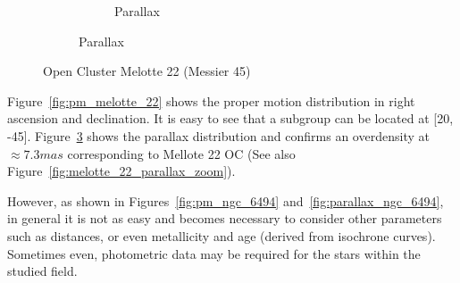\documentclass[11pt, a4paper, english]{book}
\begin{document}
\begin{figure}[htbp]
\begin{subfigure}{0.9\textwidth}
\begin{subfigure}[t]{0.45\textwidth}
      \caption{Parallax}
      \label{fig:pm_vec_melotte_22}
    \end{subfigure}
  \end{subfigure}
  \caption{Open Cluster Melotte 22 (Messier 45)}
\end{figure}

Figure~\ref{fig:pm_melotte_22} shows the proper motion distribution in right ascension and declination.
It is easy to see that a subgroup can be located at [20, -45].
Figure~\ref{fig:pm_vec_melotte_22} shows the parallax distribution and confirms an overdensity at
\(\approx 7.3 mas\) corresponding to Mellote 22 OC (See also Figure~\ref{fig:melotte_22_parallax_zoom}).

However, as shown in Figures~\ref{fig:pm_ngc_6494} and~\ref{fig:parallax_ngc_6494},
in general it is not as easy and becomes necessary to consider other parameters such as distances,
or even metallicity and age (derived from isochrone curves).
Sometimes even, photometric data may be required for the stars within the studied field.
\end{document}
